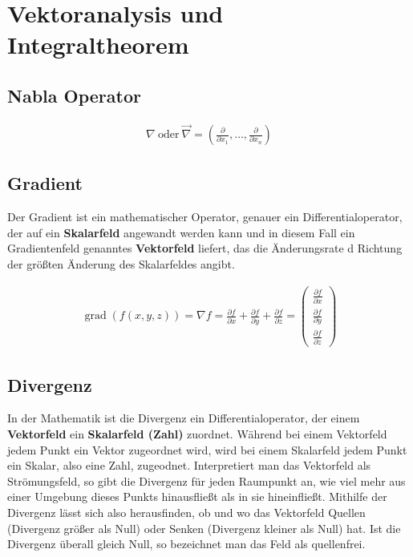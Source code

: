\documentclass[a4paper]{scrartcl}
\begin{document}
\section{Vektoranalysis und Integraltheorem}
\subsection{Nabla Operator}

\begin{align}
\nabla \: \mathrm{oder} \: \vec \nabla = \left (\frac\partial{\partial
x_1},\ldots, \frac\partial{\partial x_n}\right)
\end{align}
\subsection{Gradient}
Der Gradient ist ein mathematischer Operator, genauer ein Differentialoperator,
der auf ein \textbf{Skalarfeld} angewandt werden kann und in diesem Fall ein
Gradientenfeld genanntes \textbf{Vektorfeld} liefert, das die Änderungsrate d
Richtung der größten Änderung des Skalarfeldes angibt.

\begin{align}
\operatorname{grad}(f(x,y,z)) = \nabla f = \frac{{\partial f}}{{\partial x}} +
\frac{{\partial f}}{{\partial y}} + \frac{{\partial f}}{{\partial z}} = 
\begin{pmatrix} \frac{\partial f}{\partial x} \\ \frac{\partial f}{\partial
y} \\ \frac{\partial f}{\partial z} \end{pmatrix}
\end{align}

\subsection{Divergenz}
In der Mathematik ist die Divergenz ein Differentialoperator, der einem
\textbf{Vektorfeld} ein \textbf{Skalarfeld (Zahl)} zuordnet. Während bei einem
Vektorfeld jedem Punkt ein Vektor zugeordnet wird, wird bei einem Skalarfeld jedem Punkt ein Skalar, also
eine Zahl, zugeodnet. Interpretiert man das Vektorfeld als Strömungsfeld, so
gibt die Divergenz für jeden Raumpunkt an, wie viel mehr aus einer Umgebung
dieses Punkts hinausfließt als in sie hineinfließt. Mithilfe der Divergenz lässt
sich also herausfinden, ob und wo das Vektorfeld Quellen (Divergenz größer als
Null) oder Senken (Divergenz kleiner als Null) hat. Ist die Divergenz überall
gleich Null, so bezeichnet man das Feld als quellenfrei.
\end{document}
